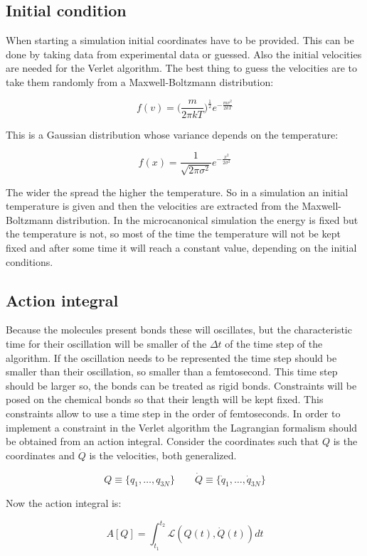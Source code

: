 	\subsection{Initial condition}
	When starting a simulation initial coordinates have to be provided.
	This can be done by taking data from experimental data or guessed.
	Also the initial velocities are needed for the Verlet algorithm.
	The best thing to guess the velocities are to take them randomly from a Maxwell-Boltzmann distribution:

	$$f(v) = \biggl(\frac{m}{2\pi kT}\biggr)^\frac{1}{2}e^{-\frac{mv^2}{2kT}}$$

	This is a Gaussian distribution whose variance depends on the temperature:

	$$f(x) = \frac{1}{\sqrt{2\pi\sigma^2}}e^{-\frac{x^2}{2\sigma^2}}$$

	The wider the spread the higher the temperature.
	So in a simulation an initial temperature is given and then the velocities are extracted from the Maxwell-Boltzmann distribution.
	In the microcanonical simulation the energy is fixed but the temperature is not, so most of the time the temperature will not be kept fixed and after some time it will reach a constant value, depending on the initial conditions.

	\subsection{Action integral}
	Because the molecules present bonds these will oscillates, but the characteristic time for their oscillation will be smaller of the $\Delta t$ of the time step of the algorithm.
	If the oscillation needs to be represented the time step should be smaller than their oscillation, so smaller than a femtosecond.
	This time step should be larger so, the bonds can be treated as rigid bonds.
	Constraints will be posed on the chemical bonds so that their length will be kept fixed.
	This constraints allow to use a time step in the order of femtoseconds.
	In order to implement a constraint in the Verlet algorithm the Lagrangian formalism should be obtained from an action integral.
	Consider the coordinates such that $Q$ is the coordinates and $\dot{Q}$ is the velocities, both generalized.

	$$Q \equiv\{q_1, \dots, q_{3N}\}\qquad \dot{Q}\equiv\{\dot{q}_1, \dots, \dot{q}_{3N}\}$$

	Now the action integral is:

	$$A[Q] = \int_{t_1}^{t_2}\mathcal{L}(Q(t), \dot{Q}(t))dt$$


